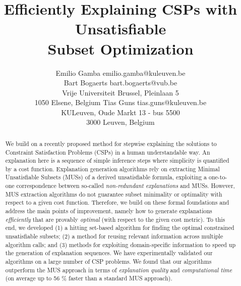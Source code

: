 \documentclass[twoside,11pt]{article}
\begin{document}
	

\title{Efficiently Explaining CSPs with Unsatisfiable\\Subset Optimization}

\author{\name Emilio Gamba \email emilio.gamba@kuleuven.be \\
\name Bart Bogaerts \email bart.bogaerts@vub.be \\
\addr Vrije Universiteit Brussel, Pleinlaan 5\\
1050 Elsene, Belgium
\AND
\name Tias Guns \email tias.guns@kuleuven.be \\
\addr KULeuven, Oude Markt 13 - bus 5500\\
3000 Leuven, Belgium
}

\maketitle

\begin{abstract}
	We build on a recently proposed method for stepwise explaining the solutions to Constraint Satisfaction Problems (CSPs) in a human understandable way. 
An explanation here is a sequence of simple inference steps where simplicity is quantified by a cost function. 
Explanation generation algorithms rely on extracting Minimal Unsatisfiable Subsets (MUSs) of a derived unsatisfiable formula, exploiting a one-to-one correspondence between so-called \emph{non-redundant explanations} and MUSs. 
However, MUS extraction algorithms do not guarantee subset minimality or optimality with respect to a given cost function. 
Therefore, we build on these formal foundations and address the main points of improvement, namely how to generate explanations \emph{efficiently} that are provably \emph{optimal} (with respect to the given cost metric). 
To this end, we developed
(1) a hitting set-based algorithm for finding the optimal constrained unsatisfiable subsets;
(2) a method for reusing relevant information across multiple algorithm calls; and
(3) methods for exploiting domain-specific information to speed up the generation of explanation sequences.
We have experimentally validated our algorithms on a large number of CSP problems. We found that our algorithms outperform the MUS approach in terms of \emph{explanation quality} and \emph{computational time} (on average up to 56 \% faster than a standard MUS approach).
\end{abstract}
\end{document}
